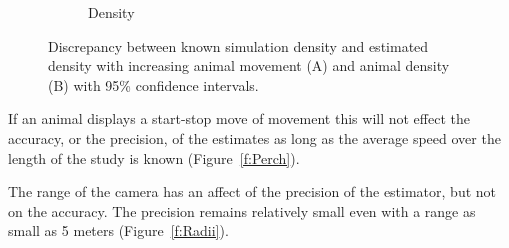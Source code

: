 \documentclass[a4paper,10pt,reqno,oneside]{amsart}
\begin{document}
\begin{figure}[t]
\begin{subfigure}[t]{0.5\textwidth}
                \caption{Density}
                \label{f:Density}
        \end{subfigure}
	\caption{Discrepancy between known simulation density and estimated density with increasing animal movement (A) and animal density (B) with 95\% confidence intervals.}
	\label{f:distanceDensity}
\end{figure}


If an animal displays a start-stop move of movement this will not effect the accuracy, or the precision, of the estimates as long as the average speed over the length of the study is known (Figure~\ref{f:Perch}). 

The range of the camera has an affect of the precision of the estimator, but not on the accuracy. The precision remains relatively small even with a range as small as 5 meters (Figure~\ref{f:Radii}). 
\end{document}
